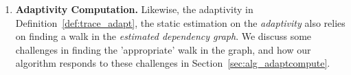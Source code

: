 \begin{enumerate}
\item \textbf{Adaptivity Computation.} 
Likewise, the adaptivity in Definition~\ref{def:trace_adapt},
the static estimation on the \emph{adaptivity} also relies on finding a walk in the \emph{estimated dependency graph}. 
We discuss some challenges in finding the 'appropriate' walk in the graph, and how our algorithm responds to these challenges
in Section~\ref{sec:alg_adaptcompute}.
\end{enumerate}